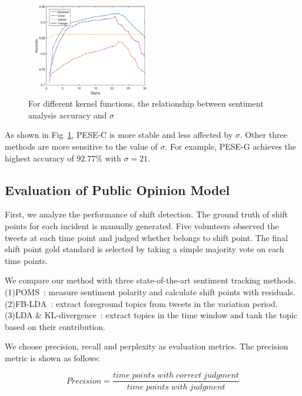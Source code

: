 \documentclass[runningheads]{llncs}
\begin{document}
\vspace{-0.6cm}
\begin{figure}
    \centering
    \includegraphics[width=0.5\textwidth,height=1.6in]{sigma.eps}
    \setlength{\abovecaptionskip}{-0.1cm}
    \caption{For different kernel functions, the relationship between sentiment analysis accuracy and $\sigma$}\label{fig:sigma}
\end{figure}

As shown in Fig~\ref{fig:sigma}, PESE-C is more stable and less affected by $\sigma$. Other three methods are more sensitive to the value of $\sigma$. For example, PESE-G achieves the highest accuracy of $92.77\%$ with $\sigma=21$.



\subsection{Evaluation of Public Opinion Model}
First, we analyze the performance of shift detection. The ground truth of shift points for each incident is manually generated. Five volunteers observed the tweets at each time point and judged whether belongs to shift point. The final shift point gold standard is selected by taking a simple majority vote on each time points.

We compare our method with three state-of-the-art sentiment tracking methods. (1)POMS~\cite{Bollen2011sentimentchange}: measure sentiment polarity and calculate shift points with residuals. (2)FB-LDA~\cite{Tan2014topic}:  extract foreground topics from tweets in the variation period. (3)LDA \& KL-divergence~\cite{Giachanou2016sentichange}: extract topics in the time window and tank the topic based on their contribution.

We choose precision, recall and perplexity as evaluation metrics. The precision metric is shown as follows:

\begin{equation}
    Precision = \frac{time\;points\;with\;correct\;judgment}{time\;points\;with\;judgment}
\end{equation}
\end{document}
